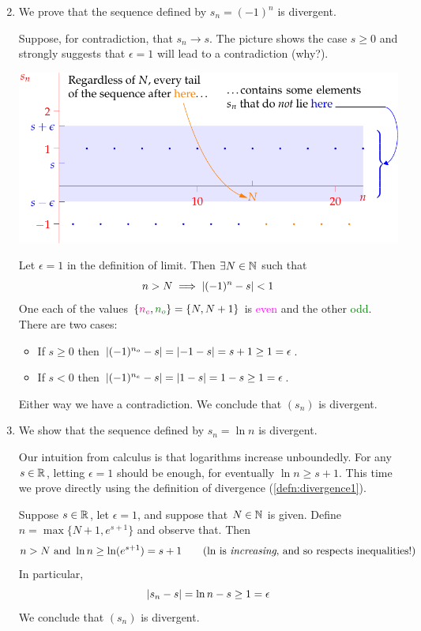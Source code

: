 \begin{tcolorbox}[exstyle]{}
	\begin{enumerate}\setcounter{enumi}{1}
		\item\label{ex:divergenceeasy2} We prove that the sequence defined by $s_n=(-1)^n$ is divergent.\smallbreak

		Suppose, for contradiction, that $s_n\to s$. The picture shows the case $s\ge 0$ and strongly suggests that $\epsilon=1$ will lead to a contradiction (why?).
		\begin{center}
   		\includegraphics[scale=0.9]{divergent2}
  	\end{center}
   	Let $\epsilon=1$ in the definition of limit. Then $\exists N\in\mathbb{N}$ such that
		\[n>N\implies \left| (-1)^n-s\right|<1\]
		One each of the values $\{\textcolor{magenta}{n_e},\textcolor{Green}{n_o}\}=\{N,N+1\}$ is \textcolor{magenta}{even} and the other \textcolor{Green}{odd}. There are two cases:
		\begin{itemize}
		  \item If $s\ge 0$ then $\left| (-1)^{n_o}-s\right|=\left| -1-s\right|=s+1\ge 1=\epsilon$.
		  \item If $s<0$ then $\left| (-1)^{n_e}-s\right|=\left| 1-s\right|=1-s\ge 1=\epsilon$.
		\end{itemize}
		Either way we have a contradiction. We conclude that $(s_n)$ is divergent.

  
  	\item\label{ex:divergence3} We show that the sequence defined by $s_n=\ln n$ is divergent.\footnotemark\smallbreak
  		
		Our intuition from calculus is that logarithms increase unboundedly. For any $s\in\mathbb{R}$, letting $\epsilon=1$ should be enough, for eventually $\ln n\ge s+1$. This time we prove directly using the definition of divergence (\ref{defn:divergence1}).\smallbreak
		
		Suppose $s\in\mathbb{R}$, let $\epsilon=1$, and suppose that $N\in\mathbb{N}$ is given. Define $n=\max\{N+1,e^{s+1}\}$ and observe that. Then
		\[n>N\text{ and }\ln n\ge \ln(e^{s+1})=s+1 \tag{$\ln$ is \emph{increasing}, and so respects inequalities!}\]
		In particular,
		\[\left| s_n-s\right|=\ln n-s\ge 1=\epsilon\]
		We conclude that $(s_n)$ is divergent.
	\end{enumerate}
\end{tcolorbox}

